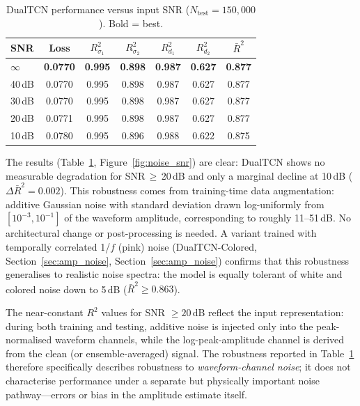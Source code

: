 \documentclass[journal]{IEEEtran}
\begin{document}
\begin{table}[t]
  \centering
  \footnotesize
  \setlength{\tabcolsep}{2pt}
  \caption{DualTCN performance versus input SNR
  ($N_\mathrm{test} = 150{,}000$). Bold = best.}
  \label{tab:noise}
  \begin{tabular}{lcccccc}
    \toprule
    SNR & Loss & $R^2_{\sigma_1}$ & $R^2_{\sigma_2}$
        & $R^2_{d_1}$ & $R^2_{d_2}$ & $\bar{R}^2$ \\
    \midrule
    $\infty$ & \textbf{0.0770} & \textbf{0.995}
             & \textbf{0.898} & \textbf{0.987}
             & \textbf{0.627} & \textbf{0.877} \\
    40\,dB   & 0.0770 & 0.995 & 0.898 & 0.987 & 0.627
             & 0.877 \\
    30\,dB   & 0.0770 & 0.995 & 0.898 & 0.987 & 0.627
             & 0.877 \\
    20\,dB   & 0.0771 & 0.995 & 0.898 & 0.987 & 0.627
             & 0.877 \\
    10\,dB   & 0.0780 & 0.995 & 0.896 & 0.988 & 0.622
             & 0.875 \\
    \bottomrule
  \end{tabular}
\end{table}


The results (Table~\ref{tab:noise}, Figure~\ref{fig:noise_snr}) are
clear: DualTCN shows no measurable degradation for
SNR\,$\geq$\,20\,dB and only a marginal decline at 10\,dB
($\Delta\bar{R}^2 = 0.002$). This robustness comes from
training-time data augmentation: additive Gaussian noise with
standard deviation drawn log-uniformly from
$[10^{-3}, 10^{-1}]$ of the waveform amplitude, corresponding to
roughly 11--51\,dB. No architectural change or post-processing is
needed.  A variant trained with temporally correlated 1/$f$ (pink)
noise (DualTCN-Colored, Section~\ref{sec:amp_noise},
Section~\ref{sec:amp_noise}) confirms that this robustness generalises
to realistic noise spectra: the model is equally tolerant of white
and colored noise down to 5\,dB ($\bar{R}^2 \geq 0.863$).

The near-constant $R^2$ values for SNR $\geq 20$\,dB reflect the
input representation: during both training and testing, additive
noise is injected only into the peak-normalised waveform channels,
while the log-peak-amplitude channel is derived from the clean (or
ensemble-averaged) signal. The robustness reported in
Table~\ref{tab:noise} therefore specifically describes robustness to
\emph{waveform-channel noise}; it does not characterise performance
under a separate but physically important noise pathway---errors or
bias in the amplitude estimate itself.
\end{document}
